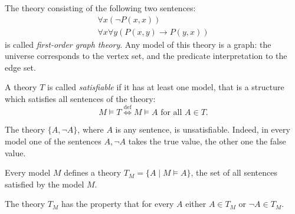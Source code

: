 \begin{page}

\begin{exl}
\label{exl:FirstGraphTheory}
The theory consisting of the following two sentences:
\begin{gather*}
\forall x (\neg P(x,x))\\
\forall x \forall y (P(x,y) \to P(y,x))
\end{gather*}
is called \emph{first-order graph theory}.
Any model of this theory is a graph:
the universe corresponds to the vertex set, and the predicate interpretation to the edge set.

\end{exl}

\end{page}

\begin{page}

\begin{dfn}
A theory $T$ is called \emph{satisfiable} if it has at least one model,
that is a structure which satisfies all sentences of the theory:
\[
M \vDash T \stackrel{\mathrm{def}}{\Longleftrightarrow} M \vDash A \text{ for all }A \in T.
\]
\end{dfn}

\end{page}

\begin{page}

\begin{exl}
The theory $\{A, \neg A\}$, where $A$ is any sentence, is unsatisfiable.
Indeed, in every model one of the sentences $A, \neg A$ takes the true value, the other one the false value.
\end{exl}

\end{page}

\begin{page}

\begin{exl}
Every model $M$ defines a theory $T_M = \{A \mid M \vDash A\}$, the set of all sentences satisfied by the model $M$.
\end{exl}

\end{page}

\begin{page}

The theory $T_M$ has the property that for every $A$ either $A \in T_M$ or $\neg A \in T_M$.



\end{page}

